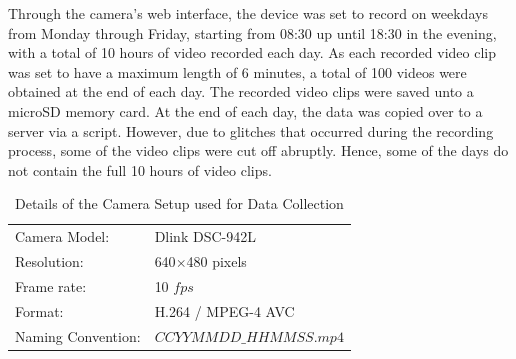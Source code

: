 Through the camera's web interface, the device was set to record on weekdays from Monday through Friday, starting from 08:30 up until 18:30 in the evening, with a total of 10 hours of video recorded each day. As each recorded video clip was set to have a maximum length of 6 minutes, a total of 100 videos were obtained at the end of each day. The recorded video clips were saved unto a microSD memory card.
At the end of each day, the data was copied over to a server via a script. However, due to glitches that occurred during the recording process, some of the video clips were cut off abruptly. Hence, some of the days do not contain the full 10 hours of video clips.

\begin{table}[!ht]\centering
\begin{tabular}{ll}
Camera Model: & Dlink DSC-942L        \\
Resolution:   & 640$\times$480 pixels \\
Frame rate:   & 10 $fps$             \\
Format:       & H.264 / MPEG-4 AVC    \\
Naming Convention: & $CCYYMMDD\_HHMMSS.mp4$
\end{tabular}
\vspace{1em}
\caption{Details of the Camera Setup used for Data Collection}
\end{table}

